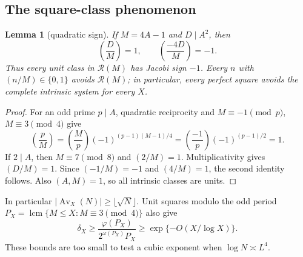 \documentclass[10pt,reqno]{amsart}
\newtheorem{lemma}[theorem]{Lemma}
\theoremstyle{definition}
\newcommand{\Rcal}{\mathscr R}
\newcommand{\Av}{\operatorname {Av}}
\newcommand{\lcm}{\operatorname {lcm}}
\newcommand{\1}{\mathbf 1}
\begin{document}
\subsection{The square-class phenomenon}
\begin{lemma}[quadratic sign]\label{lem:jacobi}
If $M=4A-1$ and $D\mid A^2$, then
\[
 \left(\frac DM\right)=1,
 \qquad
 \left(\frac{-4D}M\right)=-1.
\]
Thus every unit class in $\Rcal(M)$ has Jacobi sign $-1$.  Every $n$ with $(n/M)\in\{0,1\}$ avoids $\Rcal(M)$; in particular, every perfect square avoids the complete intrinsic system for every $X$.
\end{lemma}
\begin{proof}
For an odd prime $p\mid A$, quadratic reciprocity and $M\equiv-1\pmod p$, $M\equiv3\pmod4$ give
\[
 \left(\frac pM\right)=\left(\frac Mp\right)
 (-1)^{(p-1)(M-1)/4}
 =\left(\frac{-1}p\right)(-1)^{(p-1)/2}=1.
\]
If $2\mid A$, then $M\equiv7\pmod8$ and $(2/M)=1$.  Multiplicativity gives $(D/M)=1$.  Since $(-1/M)=-1$ and $(4/M)=1$, the second identity follows.  Also $(A,M)=1$, so all intrinsic classes are units.
\end{proof}
In particular $|\Av_X(N)|\geq\lfloor\sqrt N\rfloor$.  Unit squares modulo the odd period
$P_X=\lcm\{M\leq X:M\equiv3\pmod4\}$ also give
\[
 \delta_X\geq\frac{\varphi(P_X)}{2^{\omega(P_X)}P_X}
 \geq\exp\{-O(X/\log X)\}.
\]
These bounds are too small to test a cubic exponent when $\log N\asymp L^4$.
\end{document}
